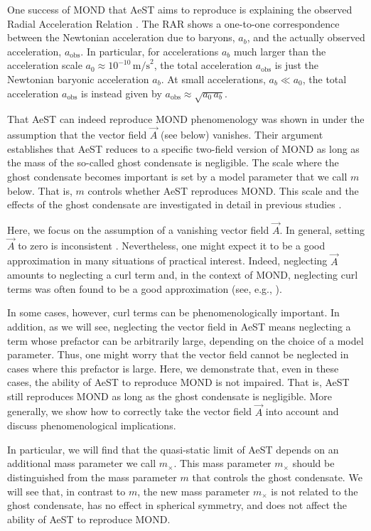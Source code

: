 \documentclass[reprint, amsmath,amssymb, nofootinbib, aps, prd]{revtex4-2}
\begin{document}
One success of MOND that AeST aims to reproduce is explaining the observed Radial Acceleration Relation \citep[RAR,][]{Lelli2017b, Brouwer2021, Mistele2023d}.
The RAR shows a one-to-one correspondence between the Newtonian acceleration due to baryons, $a_{b}$, and the actually observed acceleration, $a_{\mathrm{obs}}$.
In particular, for accelerations $a_{b}$ much larger than the acceleration scale $a_0 \approx 10^{-10}\,\mathrm{m/s}^2$, the total acceleration $a_{\mathrm{obs}}$ is just the Newtonian baryonic acceleration $a_{b}$.
At small accelerations, $a_{b} \ll a_0$, the total acceleration $a_{\mathrm{obs}}$ is instead given by $ a_{\mathrm{obs}} \approx \sqrt{a_0 \, a_{b}}$.

That AeST can indeed reproduce MOND phenomenology was shown in \cite{Skordis2020} under the assumption that the vector field $\vec{A}$ (see below) vanishes.
Their argument establishes that AeST reduces to a specific two-field version of MOND as long as the mass of the so-called ghost condensate is negligible.
The scale where the ghost condensate becomes important is set by a model parameter that we call $m$ below.
That is, $m$ controls whether AeST reproduces MOND.
This scale and the effects of the ghost condensate are investigated in detail in previous studies \citep{Skordis2020, Mistele2023,Verwayen2023}.

Here, we focus on the assumption of a vanishing vector field $\vec{A}$.
In general, setting $\vec{A}$ to zero is inconsistent \citep{Mistele2023}.
Nevertheless, one might expect it to be a good approximation in many situations of practical interest.
Indeed, neglecting $\vec{A}$ amounts to neglecting a curl term and, in the context of MOND, neglecting curl terms was often found to be a good approximation (see, e.g., \cite{Bekenstein1984}).

In some cases, however, curl terms can be phenomenologically important.
In addition, as we will see, neglecting the vector field in AeST means neglecting a term whose prefactor can be arbitrarily large, depending on the choice of a model parameter.
Thus, one might worry that the vector field cannot be neglected in cases where this prefactor is large.
Here, we demonstrate that, even in these cases, the ability of AeST to reproduce MOND is not impaired.
That is, AeST still reproduces MOND as long as the ghost condensate is negligible.
More generally, we show how to correctly take the vector field $\vec{A}$ into account and discuss phenomenological implications.

In particular, we will find that the quasi-static limit of AeST depends on an additional mass parameter we call $m_\times$.
This mass parameter $m_\times$ should be distinguished from the mass parameter $m$ that controls the ghost condensate.
We will see that, in contrast to $m$, the new mass parameter $m_\times$ is not related to the ghost condensate, has no effect in spherical symmetry, and does not affect the ability of AeST to reproduce MOND.
\end{document}
